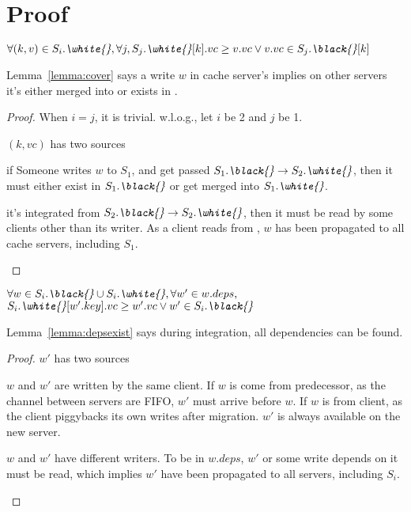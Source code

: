 \section{Proof}\label{s:appendix}
\begin{lemma}\label{lemma:cover}
$
\forall (k, v) \in S_i.\textit{\white{}}, \forall j, \\
S_j.\textit{\white{}}[k].vc \ge v.vc \lor v.vc \in S_j.\textit{\black{}}[k]
$
\end{lemma}

Lemma~\ref{lemma:cover} says a write $w$ in cache server's \white{} implies on other servers it's either merged into \white{} or exists in \black{}.

\begin{proof}
When $i = j$, it is trivial. w.l.o.g., let $i$ be 2 and $j$ be 1.

$(k, vc)$ has two sources
\begin{myenumerate2}
    \item if Someone writes $w$ to $S_1$, and get passed $S_1.\textit{\black{}} \to S_2.\textit{\white{}}$,
      then it must either exist in $S_1.\textit{\black{}}$ or get merged into $S_1.\textit{\white{}}$.
    \item it's integrated from $S_2.\textit{\black{}} \to S_2.\textit{\white{}}$, then it must be
      read by some clients other than its writer. As a client reads from \white{}, $w$ has been
      propagated to all cache servers, including $S_1$.
\end{myenumerate2}
\end{proof}

\begin{lemma}\label{lemma:depsexist}
$\forall w \in S_i.\textit{\black{}} \cup S_i.\textit{\white{}}, \forall w' \in w.deps,$
$S_i.\textit{\white{}}[w'.key].vc \ge w'.vc \lor w' \in S_i.\textit{\black{}}$
\end{lemma}

Lemma~\ref{lemma:depsexist} says during integration, all dependencies can be found.
\begin{proof}
$w'$ has two sources
\begin{myenumerate2}
\item $w$ and $w'$ are written by the same client. If $w$ is come from predecessor, as the channel between servers are FIFO, $w'$ must arrive before $w$. If $w$ is from client, as the client piggybacks its own writes after migration. $w'$ is always available on the new server.
\item $w$ and $w'$ have different writers. To be in $w.deps$, $w'$ or some write depends on it must be read, which implies $w'$ have been propagated to all servers, including $S_i$.
\end{myenumerate2}
\end{proof}



